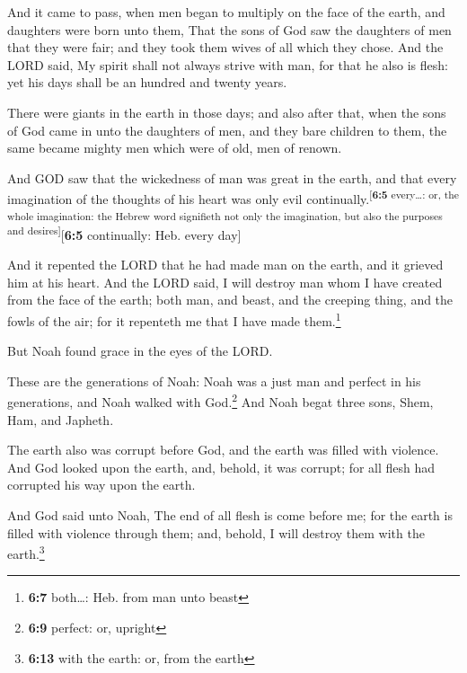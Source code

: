  And it came to pass, when men began to multiply on the
face of the earth, and daughters were born unto them, 
That the sons of God saw the daughters of men that they were fair; and
they took them wives of all which they chose.  And the
LORD said, My spirit shall not always strive with man, for that he also
is flesh: yet his days shall be an hundred and twenty years.

 There were giants in the earth in those days; and also
after that, when the sons of God came in unto the daughters of men, and
they bare children to them, the same became mighty men which were of
old, men of renown.

 And GOD saw that the wickedness of man was great in the
earth, and that every imagination of the thoughts of his heart was only
evil continually.\textsuperscript{{[}\textbf{6:5} every\ldots: or, the
whole imagination: the Hebrew word signifieth not only the imagination,
but also the purposes and desires{]}}{[}\textbf{6:5} continually: Heb.
every day{]}

 And it repented the LORD that he had made man on the
earth, and it grieved him at his heart.  And the LORD
said, I will destroy man whom I have created from the face of the earth;
both man, and beast, and the creeping thing, and the fowls of the air;
for it repenteth me that I have made them.\footnote{\textbf{6:7}
  both\ldots: Heb. from man unto beast}

 But Noah found grace in the eyes of the LORD.

 These are the generations of Noah: Noah was a just man
and perfect in his generations, and Noah walked with God.\footnote{\textbf{6:9}
  perfect: or, upright}  And Noah begat three sons, Shem,
Ham, and Japheth.

 The earth also was corrupt before God, and the earth was
filled with violence.  And God looked upon the earth,
and, behold, it was corrupt; for all flesh had corrupted his way upon
the earth.

 And God said unto Noah, The end of all flesh is come
before me; for the earth is filled with violence through them; and,
behold, I will destroy them with the earth.\footnote{\textbf{6:13} with
  the earth: or, from the earth}

